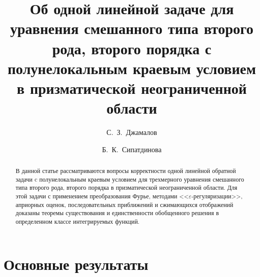 \ifPDFTeX
\usepackage[T2A]{fontenc}
\usepackage[utf8]{inputenc} %
\usepackage[english,russian]{babel}
\fi

\usepackage{todonotes}

\usepackage[russian]{nla}


\fi

\title{Об одной линейной задаче для уравнения смешанного типа второго рода, второго порядка с полунелокальным краевым условием в призматической неограниченной области}
\author{С.~З.~Джамалов \and  Б.~К.~Сипатдинова
  \and
}


\maketitle

\begin{abstract}
В данной статье рассматриваются вопросы корректности одной линейной обратной задачи c полунелокальным краевым условием для трехмерного уравнения смешанного типа второго рода, второго порядка в призматической неограниченной области. Для этой задачи с применением преобразования Фурье, методами <<$\varepsilon$-регуляризации>>, априорных оценок, последовательных приближений и сжимающихся отображений доказаны теоремы существования и единственности обобщенного решения в определенном классе интегрируемых функций.

\end{abstract}

\section{Основные результаты} %

